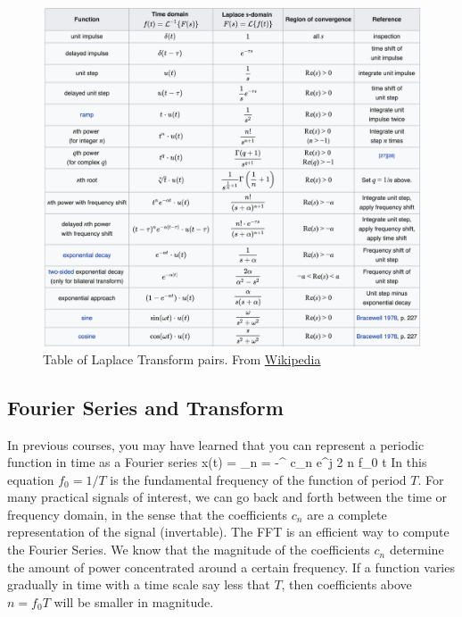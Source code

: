\begin{figure}[tb]
\begin{center}
\includegraphics[width=\columnwidth]{laplace_transform.png}
\end{center}
\caption{Table of Laplace Transform pairs.  From \href{https://en.wikipedia.org/wiki/Laplace_transform}{Wikipedia} }\label{fig:laplace_xform}
\end{figure}





\subsection{Fourier Series and Transform}


In previous courses, you may have learned that you can represent a periodic function in time as a Fourier series
\be
	x(t) = \sum_{n = -\infty}^{\infty} c_n e^{j 2 \pi n f_0 t}
\ee
In this equation $f_0 = 1/T$ is the fundamental frequency of the function of period $T$.  For many practical signals of interest, we can go back and forth between the time or frequency domain, in the sense that the coefficients $c_n$ are a complete representation of the signal (invertable).  The FFT is an efficient way to compute the Fourier Series.   We know that the magnitude of the coefficients $c_n$ determine the amount of power concentrated around a certain frequency.  If a function varies gradually in time with a time scale say less that $T$, then coefficients above $n =  f_0 T $ will be smaller in magnitude.
 
